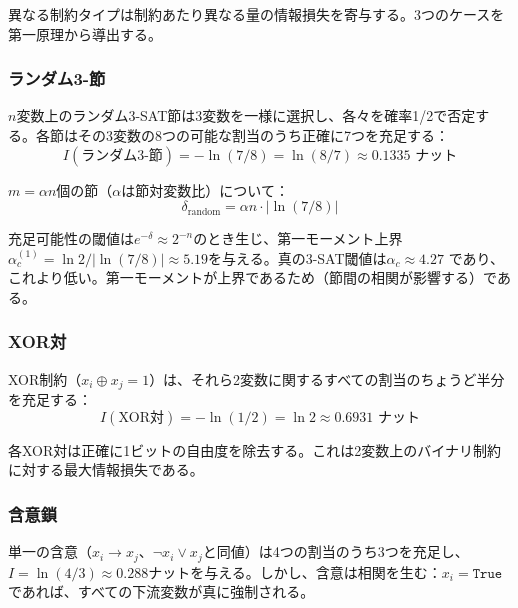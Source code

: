 \documentclass[11pt,a4paper]{article}
\begin{document}
異なる制約タイプは制約あたり異なる量の情報損失を寄与する。3つのケースを第一原理から導出する。

\subsubsection{ランダム3-節}

$n$変数上のランダム3-SAT節は3変数を一様に選択し、各々を確率1/2で否定する。各節はその3変数の8つの可能な割当のうち正確に7つを充足する：
\begin{equation}
I(\text{ランダム3-節}) = -\ln(7/8) = \ln(8/7) \approx 0.1335 \text{ ナット}
\label{eq:delta-random}
\end{equation}

$m = \alpha n$個の節（$\alpha$は節対変数比）について：
\begin{equation}
\delta_{\text{random}} = \alpha n \cdot |\ln(7/8)|
\label{eq:delta-random-total}
\end{equation}

充足可能性の閾値は$e^{-\delta} \approx 2^{-n}$のとき生じ、第一モーメント上界$\alpha_c^{(1)} = \ln 2 / |\ln(7/8)| \approx 5.19$を与える。真の3-SAT閾値は$\alpha_c \approx 4.27$ \cite{mezard2002,friedgut1999,achlioptas2009}であり、これより低い。第一モーメントが上界であるため（節間の相関が影響する）である。

\subsubsection{XOR対}

XOR制約（$x_i \oplus x_j = 1$）は、それら2変数に関するすべての割当のちょうど半分を充足する：
\begin{equation}
I(\text{XOR対}) = -\ln(1/2) = \ln 2 \approx 0.6931 \text{ ナット}
\label{eq:delta-xor}
\end{equation}

各XOR対は正確に1ビットの自由度を除去する。これは2変数上のバイナリ制約に対する最大情報損失である。

\subsubsection{含意鎖}

単一の含意（$x_i \to x_j$、$\neg x_i \lor x_j$と同値）は4つの割当のうち3つを充足し、$I = \ln(4/3) \approx 0.288$ナットを与える。しかし、含意は相関を生む：$x_i = \mathtt{True}$であれば、すべての下流変数が真に強制される。
\end{document}
